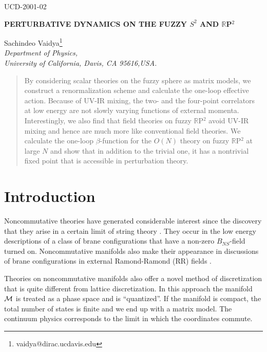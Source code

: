 \documentclass[a4paper,12pt]{article}
\numberwithin{equation}{section}
\begin{document}
\begin{flushright}
UCD-2001-02\\
\end{flushright}
\begin{center}
{\large{\bf PERTURBATIVE DYNAMICS ON THE FUZZY $S^2$ AND ${\mathbb
R}$P$^2$}}
\bigskip 

Sachindeo Vaidya\footnote{vaidya@dirac.ucdavis.edu}\\ 
{\it Department of Physics, \\
University of California, Davis, CA 95616,USA.} \\

\end{center}

\begin{abstract}
By considering scalar theories on the fuzzy sphere as matrix models,
we construct a renormalization scheme and calculate the one-loop
effective action. Because of UV-IR mixing, the two- and the four-point
correlators at low energy are not slowly varying functions of external
momenta. Interestingly, we also find that field theories on fuzzy
${\mathbb R}$P$^2$ avoid UV-IR mixing and hence are much more like
conventional field theories. We calculate the one-loop
$\beta$-function for the $O(N)$ theory on fuzzy ${\mathbb R}$P$^2$ at
large $N$ and show that in addition to the trivial one, it has a
nontrivial fixed point that is accessible in perturbation theory.
\end{abstract}

\section{Introduction}

Noncommutative theories have generated considerable interest since the
discovery that they arise in a certain limit of string theory
\cite{seiwitt}. They occur in the low energy descriptions of a class
of brane configurations that have a non-zero $B_{NS}$-field turned
on. Noncommutative manifolds also make their appearance in discussions
of brane configurations in external Ramond-Ramond (RR) fields
\cite{myers}.

Theories on noncommutative manifolds also offer a novel method of
discretization that is quite different from lattice discretization. In
this approach the manifold ${\cal M}$ is treated as a phase space and
is ``quantized''. If the manifold is compact, the total number of
states is finite and we end up with a matrix model. The continuum
physics corresponds to the limit in which the coordinates commute. 
\end{document}
